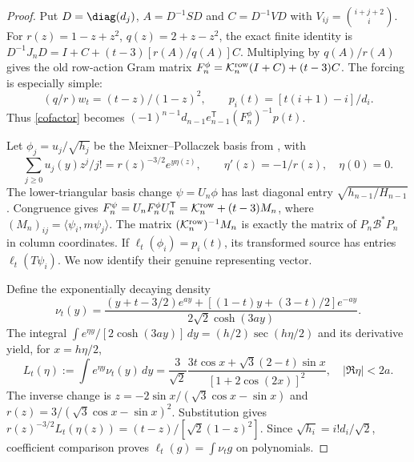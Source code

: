 \begin{proof}
Put $D=\diag(d_j)$, $A=D^{-1}SD$ and
$C=D^{-1}VD$ with $V_{ij}=\binom{i+j+2}{i}$.
For $r(z)=1-z+z^2$, $q(z)=2+z-z^2$, the exact finite identity is
$D^{-1}J_nD=I+C+(t-3)[r(A)/q(A)]C$.
Multiplying by $q(A)/r(A)$ gives the old row-action Gram matrix
$F_n^\phi=\mathcal K_n^{\rm row}(I+C)+(t-3)C$.
The forcing is especially simple:
\[
 (q/r)w_t=(t-z)/(1-z)^2,\qquad
 p_i(t)=[t(i+1)-i]/d_i.
\]
Thus \eqref{cofactor} becomes
$(-1)^{n-1}d_{n-1}e_{n-1}^{\mathsf T}(F_n^\phi)^{-1}p(t)$.

Let $\phi_j=u_j/\sqrt{h_j}$ be the Meixner--Pollaczek basis from
\cite[Section 6]{r124}, with
\[
 \sum_{j\ge0}u_j(y)z^j/j!=r(z)^{-3/2}e^{y\eta(z)},\qquad
 \eta'(z)=-1/r(z),\quad\eta(0)=0.
\]
The lower-triangular basis change $\psi=U_n\phi$ has last diagonal
entry $\sqrt{h_{n-1}/H_{n-1}}$. Congruence gives
$F_n^\psi=U_nF_n^\phi U_n^{\mathsf T}=\mathcal K_n^{\rm row}
+(t-3)M_n$, where $(M_n)_{ij}=\langle\psi_i,m\psi_j\rangle$.
The matrix $(\mathcal K_n^{\rm row})^{-1}M_n$ is exactly the matrix
of $P_n\mathcal B^*P_n$ in column coordinates. If
$\ell_t(\phi_i)=p_i(t)$, its transformed source has entries
$\ell_t(T\psi_i)$. We now identify their genuine representing vector.

Define the exponentially decaying density
\[
 \nu_t(y)=\frac{(y+t-3/2)e^{ay}+[(1-t)y+(3-t)/2]e^{-ay}}
                    {2\sqrt2\cosh(3ay)}.
\]
The integral
$\int e^{\eta y}/[2\cosh(3ay)]\,dy=(h/2)\sec(h\eta/2)$
and its derivative yield, for $x=h\eta/2$,
\begin{equation}\label{Lsource}
 L_t(\eta):=\int e^{\eta y}\nu_t(y)\,dy
 =\frac3{\sqrt2}\frac{3t\cos x+\sqrt3(2-t)\sin x}
                            {[1+2\cos(2x)]^2},\quad |\Re\eta|<2a.
\end{equation}
The inverse change is
$z=-2\sin x/(\sqrt3\cos x-\sin x)$ and
$r(z)=3/(\sqrt3\cos x-\sin x)^2$.
Substitution gives
$r(z)^{-3/2}L_t(\eta(z))=(t-z)/[\sqrt2(1-z)^2]$.
Since $\sqrt{h_i}=i!d_i/\sqrt2$, coefficient comparison proves
$\ell_t(g)=\int\nu_tg$ on polynomials.


\end{proof}
